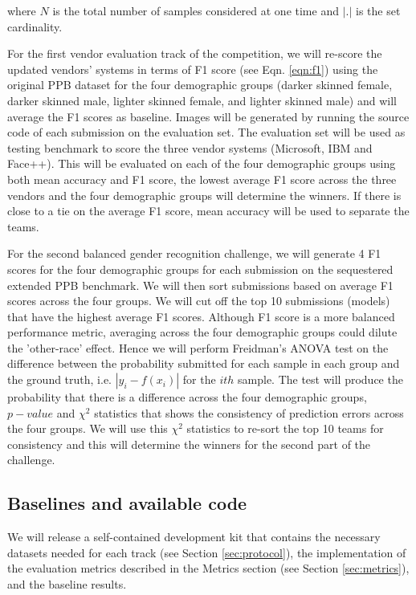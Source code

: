 \documentclass[11pt, oneside]{article}
\begin{document}
where $N$ is the total number of samples considered at one time and $|.|$ is 
the set cardinality.

For the first vendor evaluation track of the competition, we will re-score the 
updated vendors' systems in terms of F1 score (see Eqn. \ref{eqn:f1}) using the 
original PPB dataset for the four demographic groups (darker skinned female, darker 
skinned male, lighter skinned female, and lighter skinned male) and will average the F1 
scores as baseline. Images will be generated by running the source code of each 
submission on the evaluation set.  The evaluation set will be used as testing 
benchmark to score the three vendor systems (Microsoft, IBM and Face++).  This 
will be evaluated on each of the four demographic groups using both mean 
accuracy and F1 score, the lowest average F1 score across the three vendors and 
the four demographic groups will determine the winners. If there is close to a 
tie on the average F1 score, mean accuracy will be used to separate the teams.

For the second balanced gender recognition challenge, we will generate 4 F1 
scores for the four demographic groups for each submission on the sequestered 
extended PPB benchmark. We will then sort submissions based on average F1 
scores across the four groups. We will cut off the top 10 submissions (models) 
that have the highest average F1 scores. Although F1 score is a more balanced 
performance metric, averaging across the four demographic groups could dilute 
the 'other-race' effect. Hence we will perform Freidman's ANOVA test on the 
difference between the probability submitted for each sample in each group and 
the ground truth, i.e. $|y_{i} - f(x_{i})|$ for the $ith$ sample. The test will 
produce the probability that there is a difference across the four demographic 
groups, $p-value$ and $\chi^{2}$ statistics that shows the consistency of 
prediction errors across the four groups. We will use this $\chi^{2}$ 
statistics to re-sort the top 10 teams for consistency and this will determine 
the winners for the second part of the challenge.

\subsection{Baselines and available code}

We will release a self-contained development kit that contains the necessary 
datasets needed for each track (see Section \ref{sec:protocol}), the 
implementation of the evaluation metrics described in the Metrics section (see 
Section \ref{sec:metrics}), and the baseline results.
\end{document}
